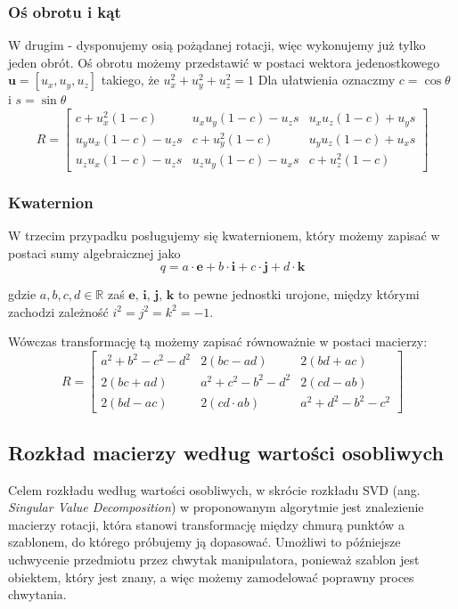 \documentclass[12pt]{article}
\begin{document}
\subsubsection*{Oś obrotu i kąt}
W drugim - dysponujemy osią pożądanej rotacji, więc wykonujemy już tylko jeden obrót. Oś obrotu możemy przedstawić w postaci wektora jedenostkowego $\textbf{u} = [u_{x}, u_{y}, u_{z}]$ takiego, że $u_{x}^2+u_{y}^2+u_{z}^2 = 1$ 
Dla ułatwienia oznaczmy $c = \cos \theta$ i $s = \sin \theta$
\[
R = \begin{bmatrix}
c+u_{x}^2(1-c) & u_{x}u_{y}(1-c)-u_{z}s & u_{x}u_{z}(1-c)+u_{y}s \\
u_{y}u_{x}(1-c)-u_{z}s & c+u_{y}^2(1-c) & u_{y}u_{z}(1-c)+u_{x}s \\
u_{z}u_{x}(1-c)-u_{z}s & u_{z}u_{y}(1-c)-u_{x}s & c+u_{z}^2(1-c)
\end{bmatrix}
\]

\subsubsection*{Kwaternion}
W trzecim przypadku posługujemy się kwaternionem, który możemy zapisać w postaci sumy algebraicznej jako
\[q = a \cdot \textbf{e} + b \cdot \textbf{i} + c \cdot \textbf{j} + d \cdot \textbf{k} \]

gdzie $a, b, c, d \in \mathbb{R}$ zaś $\textbf{e, i, j, k}$ to pewne jednostki urojone, między którymi zachodzi zależność $i^2 = j^2 = k^2 = -1$.

Wówczas transformację tą możemy zapisać równoważnie w postaci macierzy:
\[
R = \begin{bmatrix}
a^2+b^2-c^2-d^2 & 2(bc-ad) & 2(bd+ac) \\
2(bc+ad) & a^2+c^2-b^2-d^2 & 2(cd-ab) \\
2(bd-ac) & 2(cd \cdot ab) & a^2+d^2-b^2-c^2
\end{bmatrix}
\]

\newpage
\subsection{Rozkład macierzy według wartości osobliwych}
Celem rozkładu według wartości osobliwych, w skrócie rozkładu SVD (ang. \emph{Singular Value Decomposition}) w proponowanym algorytmie jest znalezienie macierzy rotacji, która stanowi transformację między chmurą punktów a szablonem, do którego próbujemy ją dopasować. Umożliwi to późniejsze uchwycenie przedmiotu przez chwytak manipulatora, ponieważ szablon jest obiektem, który jest znany, a więc możemy zamodelować poprawny proces chwytania.
\end{document}
